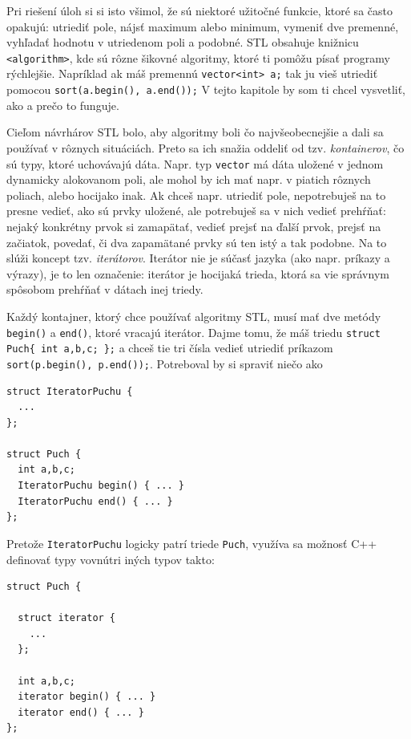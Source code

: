 \documentclass[10pt]{article}
\def\prg{\lstinline}
\def\ods{\vspace*{10pt}}
\begin{document}
Pri riešení úloh si si isto všimol, že sú niektoré užitočné funkcie, ktoré sa
často opakujú: utriediť pole, nájsť maximum alebo minimum, vymeniť dve premenné,
vyhľadať hodnotu v utriedenom poli a podobné. STL obsahuje knižnicu {\tt <algorithm>},
kde sú rôzne šikovné algoritmy, ktoré ti pomôžu písať programy rýchlejšie. Napríklad
ak máš premennú \prg!vector<int> a;! tak ju vieš utriediť pomocou
\prg!sort(a.begin(), a.end());! V tejto kapitole by som ti chcel vysvetliť, ako 
a prečo to 
funguje.

\ods Cieľom návrhárov STL bolo, aby algoritmy boli čo najvšeobecnejšie a dali 
sa používať v rôznych situáciách. Preto sa ich snažia oddeliť od tzv. {\em kontainerov},
čo sú typy, ktoré uchovávajú dáta.
Napr. typ {\tt vector}
má dáta uložené v jednom dynamicky alokovanom poli, ale mohol by ich mať napr. v piatich
rôznych poliach, alebo hocijako inak.
Ak chceš napr. utriediť
pole, nepotrebuješ na to presne vedieť, ako sú prvky uložené, ale potrebuješ sa v nich vedieť
prehŕňať: nejaký konkrétny prvok si zamapätať, vedieť prejsť na ďalší prvok, prejsť
na začiatok, povedať, či dva zapamätané prvky sú ten istý a tak podobne. 
Na to slúži koncept tzv. {\em iterátorov}. Iterátor nie je súčasť jazyka (ako 
napr. príkazy a výrazy), je to len označenie: iterátor je hocijaká trieda, ktorá sa
vie správnym spôsobom prehŕňať v dátach inej triedy.

\ods
Každý kontajner, ktorý chce používať algoritmy STL, musí mať dve metódy \prg!begin()!
a \prg!end()!, ktoré vracajú iterátor. Dajme tomu, že máš triedu 
\prg!struct Puch{ int a,b,c; };! a chceš tie tri čísla vedieť utriediť príkazom
\prg!sort(p.begin(), p.end());!. Potreboval by si spraviť niečo ako

\begin{lstlisting}
struct IteratorPuchu {
  ...
};

struct Puch {
  int a,b,c;
  IteratorPuchu begin() { ... }
  IteratorPuchu end() { ... }
};
\end{lstlisting}

\ods Pretože {\tt IteratorPuchu} logicky patrí triede {\tt Puch}, využíva sa možnosť C++
definovať typy vovnútri iných typov takto:

\begin{lstlisting}
struct Puch {

  struct iterator {
    ...
  };

  int a,b,c;
  iterator begin() { ... }
  iterator end() { ... }
};
\end{lstlisting}
\end{document}
